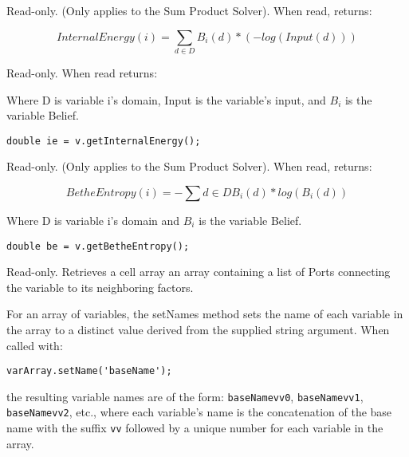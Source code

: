\label{sec:Variable.InternalEnergy}

Read-only.  (Only applies to the Sum Product Solver).  When read, returns:

\[
InternalEnergy(i) = \sum_{d \in D}B_i(d)*(-log(Input(d))) 
\]

Read-only.  When read returns:

Where D is variable i's domain, Input is the variable's input, and $B_i$ is the variable Belief.

\ifjava
\begin{lstlisting}
double ie = v.getInternalEnergy();
\end{lstlisting}
\fi

\label{sec:Variable.BetheEntropy}

Read-only.  (Only applies to the Sum Product Solver).  When read, returns:

\[
BetheEntropy(i) = - \sum{d \in D}B_i(d)*log(B_i(d))
\]

Where D is variable i's domain and $B_i$ is the variable Belief.

\ifjava
\begin{lstlisting}
double be = v.getBetheEntropy();
\end{lstlisting}
\fi



Read-only.  Retrieves \ifmatlab a cell array \fi \ifjava an array \fi containing a list of Ports connecting the variable to its neighboring factors.

\ifmatlab
{}
\fi

\ifmatlab
{}
\label{sec:Variable.setNames}

For an array of variables, the setNames method sets the name of each variable in the array to a distinct value derived from the supplied string argument.  When called with:

\begin{lstlisting}
varArray.setName('baseName');
\end{lstlisting}

the resulting variable names are of the form: \texttt{baseName\textunderscore vv0}, \texttt{baseName\textunderscore vv1}, \texttt{baseName\textunderscore vv2}, etc., where each variable's name is the concatenation of the base name with the suffix \texttt{\textunderscore vv} followed by a unique number for each variable in the array.
\fi

\ifmatlab
{}

